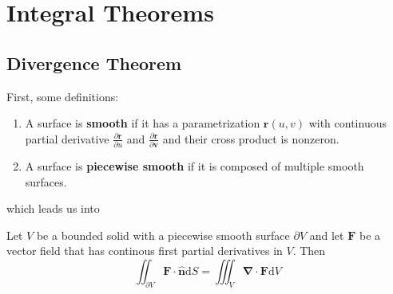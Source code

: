 \chapter{Integral Theorems}
\section{Divergence Theorem}
First, some definitions:
\begin{definition}
	\begin{enumerate}[label=\alph*.]
		\item A surface is \textbf{smooth} if it has a parametrization $\mathbf{r} (u,v)$ with continuous partial derivative $\frac{\partial \mathbf{r} }{\partial u}$ and $\frac{\partial \mathbf{r} }{\partial \mathbf{v} } $ and their cross product is nonzeron.
		\item A surface is \textbf{piecewise smooth} if it is composed of multiple smooth surfaces.
		
	\end{enumerate}
\end{definition}
which leads us into
\begin{theorem}
	Let $V$ be a bounded solid with a piecewise smooth surface $\partial V$ and let $\mathbf{F} $ be a vector field that has continous first partial derivatives in $V$. Then
	\[
		\iint_{\partial V} \mathbf{F} \cdot \hat{\mathbf{n}}\mathrm{d}S
		=
		\iiint_V \bm\nabla \cdot \mathbf{F} \mathrm{d}V
	\] 
\end{theorem}


